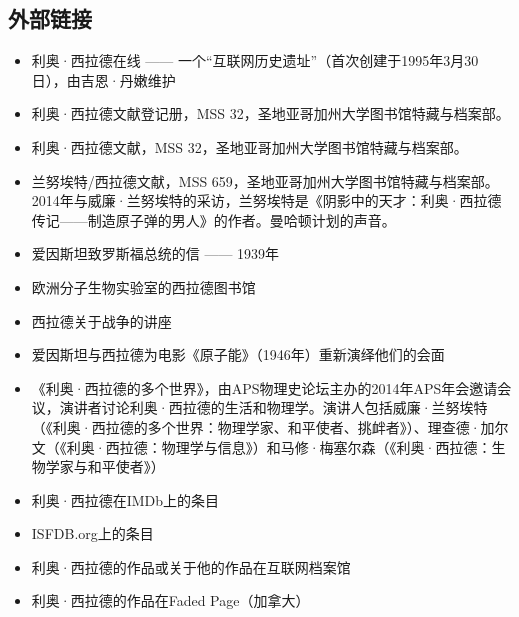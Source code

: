 \subsection{外部链接}
\begin{itemize}
\item 利奥·西拉德在线 —— 一个“互联网历史遗址”（首次创建于1995年3月30日），由吉恩·丹嫩维护  
\item 利奥·西拉德文献登记册，MSS 32，圣地亚哥加州大学图书馆特藏与档案部。  
\item 利奥·西拉德文献，MSS 32，圣地亚哥加州大学图书馆特藏与档案部。  
\item 兰努埃特/西拉德文献，MSS 659，圣地亚哥加州大学图书馆特藏与档案部。  
2014年与威廉·兰努埃特的采访，兰努埃特是《阴影中的天才：利奥·西拉德传记——制造原子弹的男人》的作者。曼哈顿计划的声音。  
\item 爱因斯坦致罗斯福总统的信 —— 1939年  
\item 欧洲分子生物实验室的西拉德图书馆  
\item 西拉德关于战争的讲座  
\item 爱因斯坦与西拉德为电影《原子能》（1946年）重新演绎他们的会面  
\item 《利奥·西拉德的多个世界》，由APS物理史论坛主办的2014年APS年会邀请会议，演讲者讨论利奥·西拉德的生活和物理学。演讲人包括威廉·兰努埃特（《利奥·西拉德的多个世界：物理学家、和平使者、挑衅者》）、理查德·加尔文（《利奥·西拉德：物理学与信息》）和马修·梅塞尔森（《利奥·西拉德：生物学家与和平使者》）  
\item 利奥·西拉德在IMDb上的条目  
\item ISFDB.org上的条目  
\item 利奥·西拉德的作品或关于他的作品在互联网档案馆  
\item 利奥·西拉德的作品在Faded Page（加拿大）
\end{itemize}